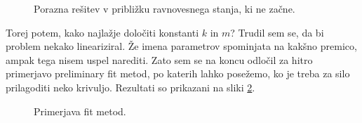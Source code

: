 \documentclass[a4paper]{article}
\begin{document}
\begin{figure}[H]
    \centering
    \caption{Porazna rešitev v približku ravnovesnega stanja, ki ne začne.}
    \label{fig:br-stac}
\end{figure}

Torej potem, kako najlažje določiti konstanti $k$ in $m$? Trudil sem se, da bi problem nekako lineariziral.
Že imena parametrov spominjata na kakšno premico, ampak tega nisem uspel narediti. Zato sem se na koncu odločil 
za hitro primerjavo preliminary fit metod, po katerih lahko posežemo, ko je treba za silo prilagoditi neko krivuljo.
Rezultati so prikazani na sliki \ref{fig:br-fit}.\\

\begin{figure}[H]
    \centering
    \caption{Primerjava fit metod.}
    \label{fig:br-fit}
\end{figure}
\end{document}

